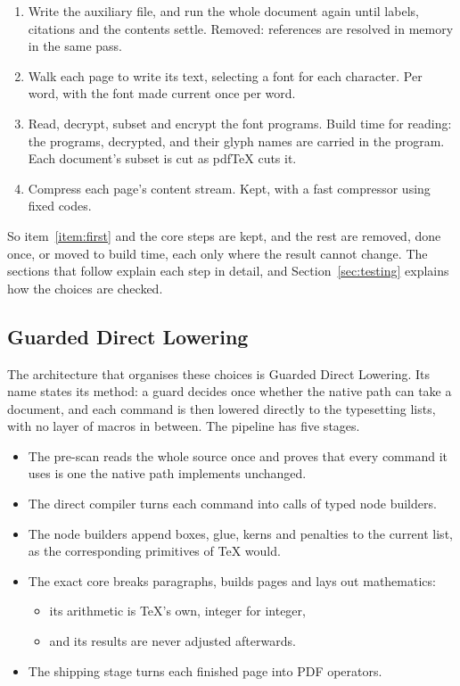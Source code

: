\documentclass{article}
\numberwithin{equation}{section}
\newcommand{\gdl}{Guarded Direct Lowering}
\theoremstyle{definition}
\theoremstyle{remark}
\begin{document}
\begin{enumerate}
        handling is written as macros over lists of box names.
        The page builder is kept; the output routine and the float queue are Rust code
        over a small array of box numbers.
  \item Write the auxiliary file, and run the whole document again until labels,
        citations and the contents settle.
        Removed: references are resolved in memory in the same pass.
  \item Walk each page to write its text, selecting a font for each character.
        Per word, with the font made current once per word.
  \item Read, decrypt, subset and encrypt the font programs.
        Build time for reading: the programs, decrypted, and their glyph names are
        carried in the program. Each document's subset is cut as pdfTeX cuts it.
  \item Compress each page's content stream.
        Kept, with a fast compressor using fixed codes.
\end{enumerate}

So item~\ref{item:first} and the core steps are kept, and the rest are removed, done
once, or moved to build time, each only where the result cannot change. The sections
that follow explain each step in detail, and Section~\ref{sec:testing} explains how the
choices are checked.

\subsection{Guarded Direct Lowering}\label{sec:gdl}

The architecture that organises these choices is \gdl. Its name states its method: a
guard decides once whether the native path can take a document, and each command is
then lowered directly to the typesetting lists, with no layer of macros in between.
The pipeline has five stages.

\begin{itemize}
  \item The pre-scan reads the whole source once and proves that every command it uses
        is one the native path implements unchanged.
  \item The direct compiler turns each command into calls of typed node builders.
  \item The node builders append boxes, glue, kerns and penalties to the current list,
        as the corresponding primitives of \TeX{} would.
  \item The exact core breaks paragraphs, builds pages and lays out mathematics:
    \begin{itemize}
      \item its arithmetic is \TeX's own, integer for integer,
      \item and its results are never adjusted afterwards.
    \end{itemize}
  \item The shipping stage turns each finished page into PDF operators.
\end{itemize}
\end{document}
